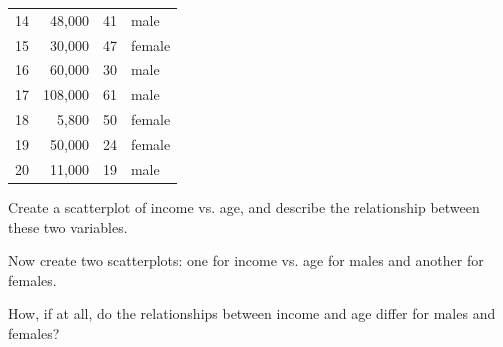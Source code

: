 {\begin{center}
\begin{minipage}[c]{0.4\textwidth}
{\begin{tabular}{rrrl}
  14 & 48,000 &  41 & male \\ 
  15 & 30,000 &  47 & female \\ 
  16 & 60,000 &  30 & male \\ 
  17 & 108,000 &  61 & male \\ 
  18 & 5,800 &  50 & female \\ 
  19 & 50,000 &  24 & female \\ 
  20 & 11,000 &  19 & male \\ 
   \hline
\end{tabular}
}
\end{minipage}
\end{center}
\begin{parts}
\item Create a scatterplot of income vs. age, and describe the relationship between these two variables.
\item Now create two scatterplots: one for income vs. age for males and another for females.
\item How, if at all, do the relationships between income and age differ for males and females?
\end{parts}
}{}


